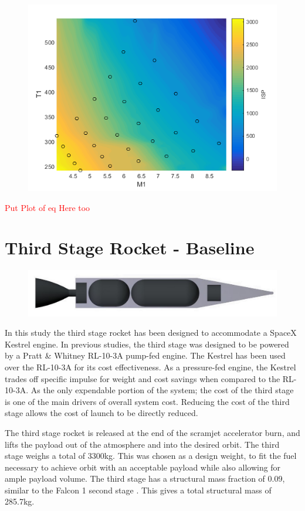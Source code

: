 	\begin{figure}
\centering
\includegraphics[width=0.7\linewidth]{figures/3_vehicle_design/ISPinterp}
\caption{}
\label{fig:ISPinterp}
\end{figure}

	
	\textcolor{red}{Put Plot of eq Here too}
	\section{Third Stage Rocket - Baseline}
	
	\begin{figure}
\centering
\includegraphics[width=0.7\linewidth]{figures/3_vehicle_design/3rdStage}
\caption{}
\label{fig:3rdStage}
\end{figure}
	
	In this study the third stage rocket has been designed to accommodate a SpaceX Kestrel engine. In previous studies, the third stage was designed to be powered by a Pratt \& Whitney RL-10-3A pump-fed engine. The Kestrel has been used over the RL-10-3A for its cost effectiveness. As a pressure-fed engine, the Kestrel trades off specific impulse for weight and cost savings when compared to the RL-10-3A. As the only expendable portion of the system; the cost of the third stage is one of the main drivers of overall system cost. Reducing the cost of the third stage allows the cost of launch to be directly reduced. 
	
	The third stage rocket is released at the end of the scramjet accelerator burn, and lifts the payload out of the atmosphere and into the desired orbit. The third stage weighs a total of 3300kg. This was chosen as a design weight, to fit the fuel necessary to achieve orbit with an acceptable payload while also allowing for ample payload volume. The third stage has a structural mass fraction of 0.09, similar to the Falcon 1 second stage \cite{Vehicle2008}. This gives a total structural mass of 285.7kg. 
	
